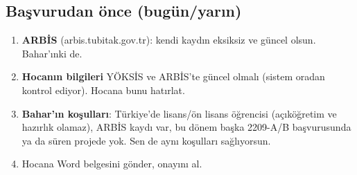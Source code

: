 \documentclass[11pt,a4paper]{article}
\begin{document}
\subsection{Başvurudan önce (bugün/yarın)}
\begin{enumerate}
\item \textbf{ARBİS} (arbis.tubitak.gov.tr): kendi kaydın eksiksiz ve güncel olsun. Bahar'ınki de.
\item \textbf{Hocanın bilgileri} YÖKSİS ve ARBİS'te güncel olmalı (sistem oradan kontrol ediyor). Hocana bunu hatırlat.
\item \textbf{Bahar'ın koşulları}: Türkiye'de lisans/ön lisans öğrencisi (açıköğretim ve hazırlık olamaz), ARBİS kaydı var, bu dönem başka 2209-A/B başvurusunda ya da süren projede yok. Sen de aynı koşulları sağlıyorsun.
\item Hocana Word belgesini gönder, onayını al.
\end{enumerate}
\end{document}
